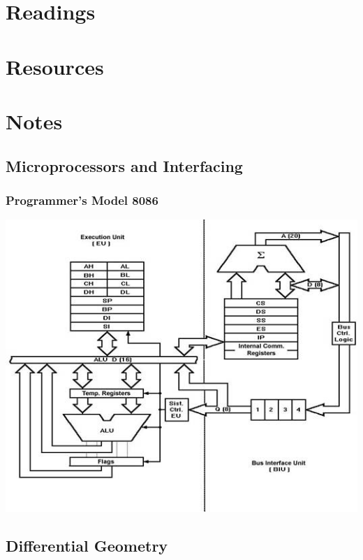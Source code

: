 \documentclass[11pt]{article}
\begin{document}
\section{Readings}
\label{sec:org9638a9c}
\section{Resources}
\label{sec:orgb99acd8}
\section{Notes}
\label{sec:org35f98ca}
\subsection{Microprocessors and Interfacing}
\label{sec:org62bb8da}
\subsubsection{Programmer's Model 8086}
\label{sec:org1add51b}

\begin{center}
\includegraphics[width=.9\linewidth]{assets/8086model.png}
\end{center}
\subsection{Differential Geometry}
\label{sec:orgb0cc969}
\end{document}
